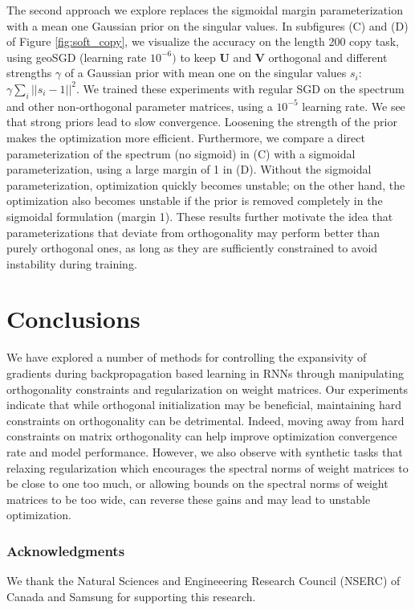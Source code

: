 \documentclass{article} %
\begin{document}
The second approach we explore replaces the sigmoidal margin parameterization with a mean one Gaussian prior on the singular values. In subfigures (C) and (D) of Figure \ref{fig:soft_copy}, we visualize the accuracy on the length 200 copy task, using geoSGD (learning rate $10^{-6})$ to keep $\mathbf{U}$ and $\mathbf{V}$ orthogonal and different strengths $\gamma$ of a Gaussian prior with mean one on the singular values $s_i$: $\gamma \sum_i ||s_i-1||^2$. We trained these experiments with regular SGD on the spectrum and other non-orthogonal parameter matrices, using a $10^{-5}$ learning rate. We see that strong priors lead to slow convergence. Loosening the strength of the prior makes the optimization more efficient. Furthermore, we compare a direct parameterization of the spectrum (no sigmoid) in (C) with a sigmoidal parameterization, using a large margin of 1 in (D). Without the sigmoidal parameterization, optimization quickly becomes unstable; on the other hand, the optimization also becomes unstable if the prior is removed completely in the sigmoidal formulation (margin 1). These results further motivate the idea that parameterizations that deviate from orthogonality may perform better than purely orthogonal ones, as long as they are sufficiently constrained to avoid instability during training.

\section{Conclusions}
We have explored a number of methods for controlling the expansivity of gradients during backpropagation based learning in RNNs through manipulating orthogonality constraints and regularization on weight matrices. Our experiments indicate that while orthogonal initialization may be beneficial, maintaining hard constraints on orthogonality can be detrimental. Indeed, moving away from hard constraints on matrix orthogonality can help improve optimization convergence rate and model performance. However, we also observe with synthetic tasks that relaxing regularization which encourages the spectral norms of weight matrices to be close to one too much, or allowing bounds on the spectral norms of weight matrices to be too wide, can reverse these gains and may lead to unstable optimization.

\subsubsection*{Acknowledgments}
We thank the Natural Sciences and Engineeering Research Council (NSERC) of Canada and Samsung for supporting this research.




\end{document}
